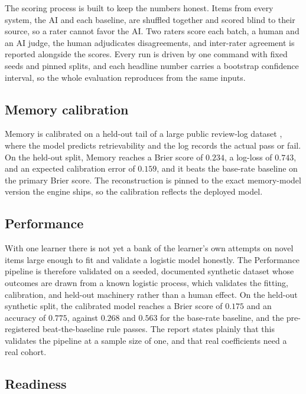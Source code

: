 \documentclass[11pt]{article}
\begin{document}
The scoring process is built to keep the numbers honest. Items from every system, the
AI and each baseline, are shuffled together and scored blind to their source, so a
rater cannot favor the AI. Two raters score each batch, a human and an AI judge, the
human adjudicates disagreements, and inter-rater agreement is reported alongside the
scores. Every run is driven by one command with fixed seeds and pinned splits, and each
headline number carries a bootstrap confidence interval, so the whole evaluation
reproduces from the same inputs.

\subsection{Memory calibration}

Memory is calibrated on a held-out tail of a large public review-log dataset
\citep{ankirevlogs2024}, where the model predicts retrievability and the log records
the actual pass or fail. On the held-out split, Memory reaches a Brier score of
$0.234$, a log-loss of $0.743$, and an expected calibration error of $0.159$, and it
beats the base-rate baseline on the primary Brier score. The reconstruction is pinned
to the exact memory-model version the engine ships, so the calibration reflects the
deployed model.

\subsection{Performance}

With one learner there is not yet a bank of the learner's own attempts on novel items
large enough to fit and validate a logistic model honestly. The Performance pipeline
is therefore validated on a seeded, documented synthetic dataset whose outcomes are
drawn from a known logistic process, which validates the fitting, calibration, and
held-out machinery rather than a human effect. On the held-out synthetic split, the
calibrated model reaches a Brier score of $0.175$ and an accuracy of $0.775$, against
$0.268$ and $0.563$ for the base-rate baseline, and the pre-registered
beat-the-baseline rule passes. The report states plainly that this validates the
pipeline at a sample size of one, and that real coefficients need a real cohort.

\subsection{Readiness}
\end{document}
